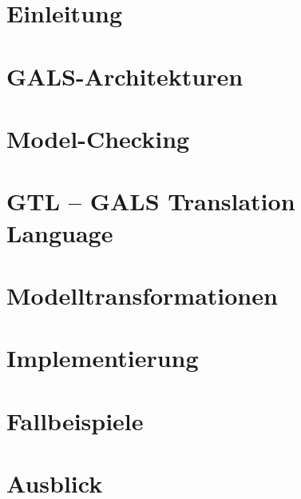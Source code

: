 \documentclass[
  10pt,
  a4paper,
  twoside,
  titlepage,
  headings=normal,
  bibliography=totoc,
  openright,
  abstract=on,
  cleardoublepage=current, %
  toc=listof
  ]{scrreprt}
\begin{document}
\cleardoublepage
{}
\tableofcontents
\listoffigures
\listoftables
\cleardoublepage
{}
\chapter{Einleitung}

\chapter{GALS-Architekturen}

\chapter{Model-Checking}


\chapter{GTL -- GALS Translation Language}

\chapter{Modelltransformationen}




\chapter{Implementierung}








\chapter{Fallbeispiele}

\chapter{Ausblick}


\begin{appendix}
  
  
\end{appendix}
\end{document}
